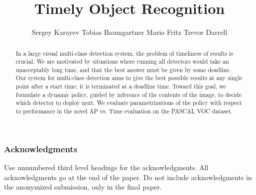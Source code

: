 \documentclass{article} %
\title{Timely Object Recognition}
\author{
Sergey Karayev \And
Tobias Baumgartner \And
Mario Fritz \And
Trevor Darrell
}
\begin{document}
\maketitle

\begin{abstract}
In a large visual multi-class detection system, the problem of timeliness of results is crucial.
We are motivated by situations where running all detectors would take an unacceptably long time, and that the best answer must be given by some deadline.
Our system for multi-class detection aims to give the best possible results at any single point after a start time; it is terminated at a deadline time.
Toward this goal, we formulate a dynamic policy, guided by inference of the contents of the image, to decide which detector to deploy next.
We evaluate parametrizations of the policy with respect to performance in the novel AP vs. Time evaluation on the PASCAL VOC dataset.
\end{abstract}





\subsubsection*{Acknowledgments}

Use unnumbered third level headings for the acknowledgments. All
acknowledgments go at the end of the paper. Do not include 
acknowledgments in the anonymized submission, only in the 
final paper. 

\renewcommand\bibsection{\subsubsection*{\refname}}

\small{
  
}
\end{document}
